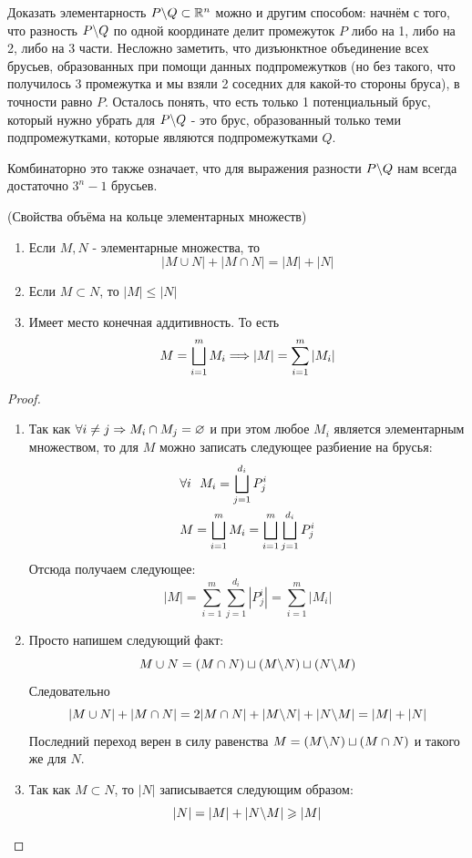 \begin{anote}
	Доказать элементарность $P \backslash Q \subset \mathbb{R}^n$ можно и другим способом: начнём с того, что разность $P \backslash Q$ по одной координате делит промежуток $P$ либо на 1, либо на 2, либо на 3 части. Несложно заметить, что дизъюнктное объединение всех брусьев, образованных при помощи данных подпромежутков (но без такого, что получилось 3 промежутка и мы взяли 2 соседних для какой-то стороны бруса), в точности равно $P$. Осталось понять, что есть только 1 потенциальный брус, который нужно убрать для $P \backslash Q$ - это брус, образованный только теми подпромежутками, которые являются подпромежутками $Q$.
	
	Комбинаторно это также означает, что для выражения разности $P \backslash Q$ нам всегда достаточно $3^n - 1$ брусьев.
\end{anote}

\begin{theorem} (Свойства объёма на кольце элементарных множеств)
	\begin{enumerate}
		
		\item Если $M, N$ - элементарные множества, то
		\[
			|M \cup N| + |M \cap N| = |M| + |N|
		\]
		
		\item Если $M \subset N$, то $|M| \le |N|$
		
		\item Имеет место конечная аддитивность. То есть
		\[
			M = \bigsqcup\limits_{i = 1}^m M_i \Longrightarrow |M| = \sum\limits_{i = 1}^m |M_i|
		\]
	\end{enumerate}
\end{theorem}

\begin{proof}~
	\begin{enumerate}

		\item[3.] Так как $\forall i \neq j \Rightarrow M_i \cap M_j = \varnothing$ и при этом любое $M_i$ является элементарным множеством, то для $M$ можно записать следующее разбиение на брусья:
		\begin{align*}
			&{\forall i\ \ M_i = \bigsqcup\limits_{j = 1}^{d_i} P_j^i}
			\\
			&{M = \bigsqcup\limits_{i = 1}^m M_i = \bigsqcup\limits_{i = 1}^m \bigsqcup\limits_{j = 1}^{d_i} P_j^i}
		\end{align*}
		Отсюда получаем следующее:
		\[
			|M| = \sum_{i = 1}^m \sum_{j = 1}^{d_i} |P_j^i| = \sum_{i = 1}^m |M_i|
		\]
		
		\item Просто напишем следующий факт:
		\[
			M \cup N = (M \cap N) \sqcup (M \backslash N) \sqcup (N \backslash M)
		\]
		Следовательно
		\[
			|M \cup N| + |M \cap N| = 2|M \cap N| + |M \backslash N| + |N \backslash M| = |M| + |N|
		\]
		Последний переход верен в силу равенства $M = (M \backslash N) \sqcup (M \cap N)$ и такого же для $N$.
		
		\item Так как $M \subset N$, то $|N|$ записывается следующим образом:
		\[
			|N| = |M| + |N \backslash M| \geqslant |M|
		\]
	\end{enumerate}
\end{proof}

